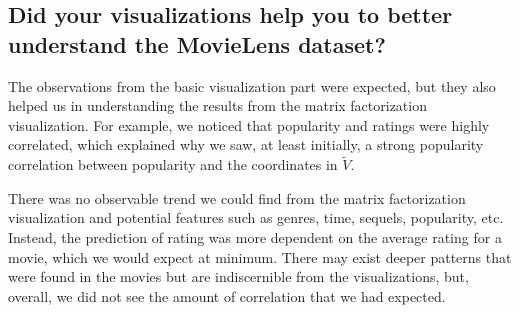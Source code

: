 \subsection*{Did your visualizations help you to better understand the MovieLens dataset?}
The observations from the basic visualization part were expected, but they also helped us in understanding the results from the matrix factorization visualization. For example, we noticed that popularity and ratings were highly correlated, which explained why we saw, at least initially, a strong popularity correlation between popularity and the coordinates in $\widetilde{V}$.

There was no observable trend we could find from the matrix factorization visualization and potential features such as genres, time, sequels, popularity, etc. Instead, the prediction of rating was more dependent on the average rating for a movie, which we would expect at minimum. There may exist deeper patterns that were found in the movies but are indiscernible from the visualizations, but, overall, we did not see the amount of correlation that we had expected.

